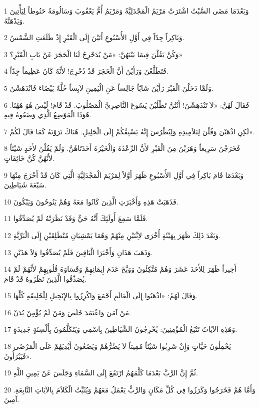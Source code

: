 \par 1 وَبَعْدَمَا مَضَى السَّبْتُ اشْتَرَتْ مَرْيَمُ الْمَجْدَلِيَّةُ وَمَرْيَمُ أُمُّ يَعْقُوبَ وَسَالُومَةُ حَنُوطاً لِيَأْتِينَ وَيَدْهَنَّهُ.
\par 2 وَبَاكِراً جِدّاً فِي أَوَّلِ الأُسْبُوعِ أَتَيْنَ إِلَى الْقَبْرِ إِذْ طَلَعَتِ الشَّمْسُ.
\par 3 وَكُنَّ يَقُلْنَ فِيمَا بَيْنَهُنَّ: «مَنْ يُدَحْرِجُ لَنَا الْحَجَرَ عَنْ بَابِ الْقَبْرِ؟»
\par 4 فَتَطَلَّعْنَ وَرَأَيْنَ أَنَّ الْحَجَرَ قَدْ دُحْرِجَ! لأَنَّهُ كَانَ عَظِيماً جِدّاً.
\par 5 وَلَمَّا دَخَلْنَ الْقَبْرَ رَأَيْنَ شَابّاً جَالِساً عَنِ الْيَمِينِ لاَبِساً حُلَّةً بَيْضَاءَ فَانْدَهَشْنَ.
\par 6 فَقَالَ لَهُنَّ: «لاَ تَنْدَهِشْنَ! أَنْتُنَّ تَطْلُبْنَ يَسُوعَ النَّاصِرِيَّ الْمَصْلُوبَ. قَدْ قَامَ! لَيْسَ هُوَ هَهُنَا. هُوَذَا الْمَوْضِعُ الَّذِي وَضَعُوهُ فِيهِ.
\par 7 لَكِنِ اذْهَبْنَ وَقُلْنَ لِتَلاَمِيذِهِ وَلِبُطْرُسَ إِنَّهُ يَسْبِقُكُمْ إِلَى الْجَلِيلِ. هُنَاكَ تَرَوْنَهُ كَمَا قَالَ لَكُمْ».
\par 8 فَخَرَجْنَ سَرِيعاً وَهَرَبْنَ مِنَ الْقَبْرِ لأَنَّ الرِّعْدَةَ وَالْحَيْرَةَ أَخَذَتَاهُنَّ. وَلَمْ يَقُلْنَ لأَحَدٍ شَيْئاً لأَنَّهُنَّ كُنَّ خَائِفَاتٍ.
\par 9 وَبَعْدَمَا قَامَ بَاكِراً فِي أَوَّلِ الأُسْبُوعِ ظَهَرَ أَوَّلاً لِمَرْيَمَ الْمَجْدَلِيَّةِ الَّتِي كَانَ قَدْ أَخْرَجَ مِنْهَا سَبْعَةَ شَيَاطِينَ.
\par 10 فَذَهَبَتْ هَذِهِ وَأَخْبَرَتِ الَّذِينَ كَانُوا مَعَهُ وَهُمْ يَنُوحُونَ وَيَبْكُونَ.
\par 11 فَلَمَّا سَمِعَ أُولَئِكَ أَنَّهُ حَيٌّ وَقَدْ نَظَرَتْهُ لَمْ يُصَدِّقُوا.
\par 12 وَبَعْدَ ذَلِكَ ظَهَرَ بِهَيْئَةٍ أُخْرَى لاِثْنَيْنِ مِنْهُمْ وَهُمَا يَمْشِيَانِ مُنْطَلِقَيْنِ إِلَى الْبَرِّيَّةِ.
\par 13 وَذَهَبَ هَذَانِ وَأَخْبَرَا الْبَاقِينَ فَلَمْ يُصَدِّقُوا وَلاَ هَذَيْنِ.
\par 14 أَخِيراً ظَهَرَ لِلأَحَدَ عَشَرَ وَهُمْ مُتَّكِئُونَ وَوَبَّخَ عَدَمَ إِيمَانِهِمْ وَقَسَاوَةَ قُلُوبِهِمْ لأَنَّهُمْ لَمْ يُصَدِّقُوا الَّذِينَ نَظَرُوهُ قَدْ قَامَ.
\par 15 وَقَالَ لَهُمُ: «اذْهَبُوا إِلَى الْعَالَمِ أَجْمَعَ وَاكْرِزُوا بِالإِنْجِيلِ لِلْخَلِيقَةِ كُلِّهَا.
\par 16 مَنْ آمَنَ وَاعْتَمَدَ خَلَصَ وَمَنْ لَمْ يُؤْمِنْ يُدَنْ.
\par 17 وَهَذِهِ الآيَاتُ تَتْبَعُ الْمُؤْمِنِينَ: يُخْرِجُونَ الشَّيَاطِينَ بِاسْمِي وَيَتَكَلَّمُونَ بِأَلْسِنَةٍ جَدِيدَةٍ.
\par 18 يَحْمِلُونَ حَيَّاتٍ وَإِنْ شَرِبُوا شَيْئاً مُمِيتاً لاَ يَضُرُّهُمْ وَيَضَعُونَ أَيْدِيَهُمْ عَلَى الْمَرْضَى فَيَبْرَأُونَ».
\par 19 ثُمَّ إِنَّ الرَّبَّ بَعْدَمَا كَلَّمَهُمُ ارْتَفَعَ إِلَى السَّمَاءِ وَجَلَسَ عَنْ يَمِينِ اللَّهِ.
\par 20 وَأَمَّا هُمْ فَخَرَجُوا وَكَرَزُوا فِي كُلِّ مَكَانٍ وَالرَّبُّ يَعْمَلُ مَعَهُمْ وَيُثَبِّتُ الْكَلاَمَ بِالآيَاتِ التَّابِعَةِ. آمِينَ.


